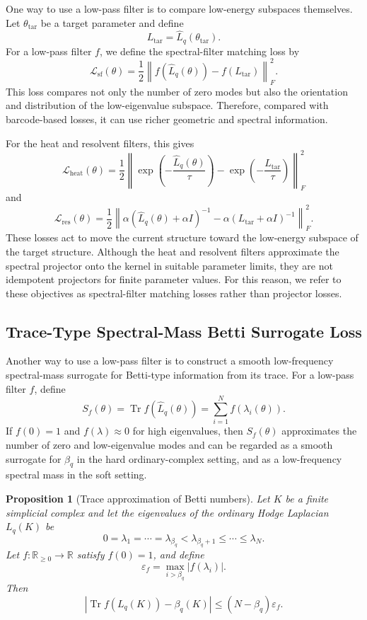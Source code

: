 \documentclass[pdflatex,sn-mathphys-ay]{sn-jnl}%
\theoremstyle{thmstyleone}%
\newtheorem{proposition}[theorem]{Proposition}%
\theoremstyle{thmstyletwo}%
\theoremstyle{thmstylethree}%
\begin{document}
One way to use a low-pass filter is to compare low-energy subspaces themselves.
Let \(\theta_{\mathrm{tar}}\) be a target parameter and define
\[
L_{\mathrm{tar}}=\widehat{L}_q(\theta_{\mathrm{tar}}).
\]
For a low-pass filter \(f\), we define the spectral-filter matching loss by
\[
\mathcal{L}_{\mathrm{sf}}(\theta)
=
\frac{1}{2}
\left\|
f(\widehat{L}_q(\theta))-f(L_{\mathrm{tar}})
\right\|_F^2.
\]
This loss compares not only the number of zero modes but also the orientation and distribution of the low-eigenvalue subspace. Therefore, compared with barcode-based losses, it can use richer geometric and spectral information.

For the heat and resolvent filters, this gives
\[
\mathcal{L}_{\mathrm{heat}}(\theta)
=
\frac{1}{2}
\left\|
\exp\left(-\frac{\widehat{L}_q(\theta)}{\tau}\right)
-
\exp\left(-\frac{L_{\mathrm{tar}}}{\tau}\right)
\right\|_F^2
\]
and
\[
\mathcal{L}_{\mathrm{res}}(\theta)
=
\frac{1}{2}
\left\|
\alpha(\widehat{L}_q(\theta)+\alpha I)^{-1}
-
\alpha(L_{\mathrm{tar}}+\alpha I)^{-1}
\right\|_F^2.
\]
These losses act to move the current structure toward the low-energy subspace of the target structure.
Although the heat and resolvent filters approximate the spectral projector onto the kernel in suitable parameter limits, they are not idempotent projectors for finite parameter values. For this reason, we refer to these objectives as spectral-filter matching losses rather than projector losses.

\subsection{Trace-Type Spectral-Mass Betti Surrogate Loss}

Another way to use a low-pass filter is to construct a smooth low-frequency spectral-mass surrogate for Betti-type information from its trace.
For a low-pass filter \(f\), define
\[
S_f(\theta)=\operatorname{Tr}f(\widehat{L}_q(\theta))
=
\sum_{i=1}^{N}f(\lambda_i(\theta)).
\]
If \(f(0)=1\) and \(f(\lambda)\approx0\) for high eigenvalues, then \(S_f(\theta)\) approximates the number of zero and low-eigenvalue modes and can be regarded as a smooth surrogate for \(\beta_q\) in the hard ordinary-complex setting, and as a low-frequency spectral mass in the soft setting.


\begin{proposition}[Trace approximation of Betti numbers]
Let \(K\) be a finite simplicial complex and let the eigenvalues of the ordinary Hodge Laplacian \(L_q(K)\) be
\[
0=\lambda_1=\cdots=\lambda_{\beta_q}
<
\lambda_{\beta_q+1}
\le \cdots \le
\lambda_N.
\]
Let \(f:\mathbb{R}_{\ge0}\to\mathbb{R}\) satisfy \(f(0)=1\), and define
\[
\varepsilon_f
=
\max_{i>\beta_q}|f(\lambda_i)|.
\]
Then
\[
\left|
\operatorname{Tr}f(L_q(K))-\beta_q(K)
\right|
\le
(N-\beta_q)\varepsilon_f.
\]
\end{proposition}
\end{document}
